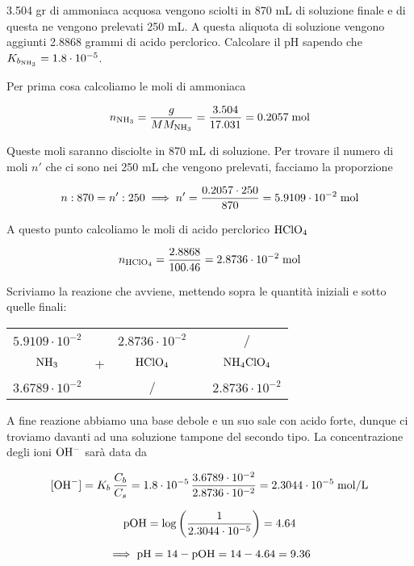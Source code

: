 \newpage

\begin{esercizio}
    3.504 gr di ammoniaca acquosa vengono sciolti in 870 mL di soluzione finale e di questa ne vengono prelevati 250 mL. A questa aliquota di soluzione vengono aggiunti 2.8868 grammi di acido perclorico. Calcolare il pH sapendo che $K_{b_{\rm NH_3}}=1.8 \cdot 10^{-5}$.
\end{esercizio}
\begin{soluzione}
    Per prima cosa calcoliamo le moli di ammoniaca

$$n_{\rm NH_3}
=\frac{g}{MM_{\rm NH_3}}
=\frac{3.504}{17.031}
=0.2057 \; \rm mol$$

Queste moli saranno disciolte in 870 mL di soluzione. Per trovare il numero di moli $n'$ che ci sono nei 250 mL che vengono prelevati, facciamo la proporzione

$$n:870=n':250
\implies
n'=\frac{0.2057 \cdot 250}{870}
=5.9109 \cdot 10^{-2} \; \rm mol$$

A questo punto calcoliamo le moli di acido perclorico $\rm HClO_4$

$$n_{\rm HClO_4}=\frac{2.8868}{100.46}=2.8736 \cdot 10^{-2} \; \rm mol$$

Scriviamo la reazione che avviene, mettendo sopra le quantità iniziali e sotto quelle finali:

\begin{center}
    \begin{tabular}{ccccc}
        $5.9109 \cdot 10^{-2}$ &  & $2.8736 \cdot 10^{-2}$ & & /\\
        $\rm NH_3$ & + & $\rm HClO_4$ & \ce{->} & $\rm NH_4ClO_4$\\
        $3.6789 \cdot 10^{-2}$ &  & / & & $2.8736 \cdot 10^{-2}$\\
    \end{tabular}
\end{center}

A fine reazione abbiamo una base debole e un suo sale con acido forte, dunque ci troviamo davanti ad una soluzione tampone del secondo tipo. La concentrazione degli ioni $\rm OH^-$ sarà data da

$$[\text{OH}^-]=K_b\,\frac{C_b}{C_s}
=1.8 \cdot 10^{-5}\,\frac{3.6789 \cdot 10^{-2}}{2.8736 \cdot 10^{-2}}
=2.3044 \cdot 10^{-5} \; \rm mol/L$$

$$\rm pOH=\log \left( \frac{1}{2.3044 \cdot 10^{-5}} \right)=4.64$$

$$\implies \rm pH=14-pOH=14-4.64=9.36$$

\end{soluzione}

